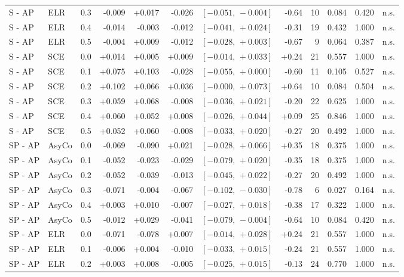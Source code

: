 \begin{landscape}
\begin{scriptsize}
\begin{longtable}{lllrrrrrrrrl}
S - AP & ELR & 0.3 & -0.009 & +0.017 & -0.026 & $[-0.051,\,-0.004]$ & -0.64 & 10 & 0.084 & 0.420 & n.s. \\
S - AP & ELR & 0.4 & -0.014 & -0.003 & -0.012 & $[-0.041,\,+0.024]$ & -0.31 & 19 & 0.432 & 1.000 & n.s. \\
S - AP & ELR & 0.5 & -0.004 & +0.009 & -0.012 & $[-0.028,\,+0.003]$ & -0.67 & 9 & 0.064 & 0.387 & n.s. \\
S - AP & SCE & 0.0 & +0.014 & +0.005 & +0.009 & $[-0.014,\,+0.033]$ & +0.24 & 21 & 0.557 & 1.000 & n.s. \\
S - AP & SCE & 0.1 & +0.075 & +0.103 & -0.028 & $[-0.055,\,+0.000]$ & -0.60 & 11 & 0.105 & 0.527 & n.s. \\
S - AP & SCE & 0.2 & +0.102 & +0.066 & +0.036 & $[-0.000,\,+0.073]$ & +0.64 & 10 & 0.084 & 0.504 & n.s. \\
S - AP & SCE & 0.3 & +0.059 & +0.068 & -0.008 & $[-0.036,\,+0.021]$ & -0.20 & 22 & 0.625 & 1.000 & n.s. \\
S - AP & SCE & 0.4 & +0.060 & +0.052 & +0.008 & $[-0.026,\,+0.044]$ & +0.09 & 25 & 0.846 & 1.000 & n.s. \\
S - AP & SCE & 0.5 & +0.052 & +0.060 & -0.008 & $[-0.033,\,+0.020]$ & -0.27 & 20 & 0.492 & 1.000 & n.s. \\
SP - AP & AsyCo & 0.0 & -0.069 & -0.090 & +0.021 & $[-0.028,\,+0.066]$ & +0.35 & 18 & 0.375 & 1.000 & n.s. \\
SP - AP & AsyCo & 0.1 & -0.052 & -0.023 & -0.029 & $[-0.079,\,+0.020]$ & -0.35 & 18 & 0.375 & 1.000 & n.s. \\
SP - AP & AsyCo & 0.2 & -0.052 & -0.039 & -0.013 & $[-0.045,\,+0.022]$ & -0.27 & 20 & 0.492 & 1.000 & n.s. \\
SP - AP & AsyCo & 0.3 & -0.071 & -0.004 & -0.067 & $[-0.102,\,-0.030]$ & -0.78 & 6 & 0.027 & 0.164 & n.s. \\
SP - AP & AsyCo & 0.4 & +0.003 & +0.010 & -0.007 & $[-0.027,\,+0.018]$ & -0.38 & 17 & 0.322 & 1.000 & n.s. \\
SP - AP & AsyCo & 0.5 & -0.012 & +0.029 & -0.041 & $[-0.079,\,-0.004]$ & -0.64 & 10 & 0.084 & 0.420 & n.s. \\
SP - AP & ELR & 0.0 & -0.071 & -0.078 & +0.007 & $[-0.014,\,+0.028]$ & +0.24 & 21 & 0.557 & 1.000 & n.s. \\
SP - AP & ELR & 0.1 & -0.006 & +0.004 & -0.010 & $[-0.033,\,+0.015]$ & -0.24 & 21 & 0.557 & 1.000 & n.s. \\
SP - AP & ELR & 0.2 & +0.003 & +0.008 & -0.005 & $[-0.025,\,+0.015]$ & -0.13 & 24 & 0.770 & 1.000 & n.s. \\

\end{longtable}
\end{scriptsize}
\end{landscape}
